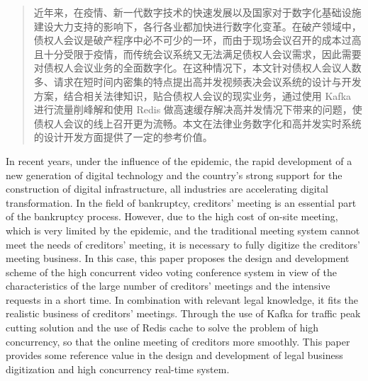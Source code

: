 
\begin{abstract}
  近年来，在疫情、新一代数字技术的快速发展以及国家对于数字化基础设施建设大力支持的影响下，各行各业都加快进行数字化变革。在破产领域中，债权人会议是破产程序中必不可少的一环，而由于现场会议召开的成本过高且十分受限于疫情，而传统会议系统又无法满足债权人会议需求，因此需要对债权人会议业务的全面数字化。在这种情况下，本文针对债权人会议人数多、请求在短时间内密集的特点提出高并发视频表决会议系统的设计与开发方案，结合相关法律知识，贴合债权人会议的现实业务，通过使用 Kafka 进行流量削峰解和使用 Redis 做高速缓存解决高并发情况下带来的问题，使债权人会议的线上召开更为流畅。本文在法律业务数字化和高并发实时系统的设计开发方面提供了一定的参考价值。
\end{abstract}

\begin{abstract*}
  In recent years, under the influence of the epidemic, the rapid development of a new generation of digital technology and the country's strong support for the construction of digital infrastructure, all industries are accelerating digital transformation. In the field of bankruptcy, creditors' meeting is an essential part of the bankruptcy process. However, due to the high cost of on-site meeting, which is very limited by the epidemic, and the traditional meeting system cannot meet the needs of creditors' meeting, it is necessary to fully digitize the creditors' meeting business. In this case, this paper proposes the design and development scheme of the high concurrent video voting conference system in view of the characteristics of the large number of creditors' meetings and the intensive requests in a short time. In combination with relevant legal knowledge, it fits the realistic business of creditors' meetings. Through the use of Kafka for traffic peak cutting solution and the use of Redis cache to solve the problem of high concurrency, so that the online meeting of creditors more smoothly. This paper provides some reference value in the design and development of legal business digitization and high concurrency real-time system.
\end{abstract*}
